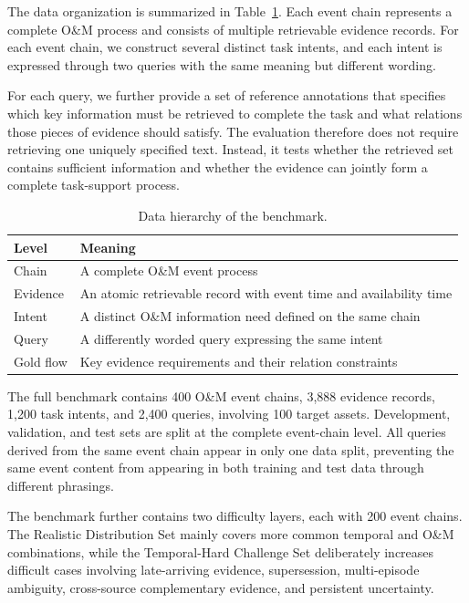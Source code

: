 The data organization is summarized in Table~\ref{tab:dataset_structure}. Each event chain represents a complete O\&M process and consists of multiple retrievable evidence records. For each event chain, we construct several distinct task intents, and each intent is expressed through two queries with the same meaning but different wording.

For each query, we further provide a set of reference annotations that specifies which key information must be retrieved to complete the task and what relations those pieces of evidence should satisfy. The evaluation therefore does not require retrieving one uniquely specified text. Instead, it tests whether the retrieved set contains sufficient information and whether the evidence can jointly form a complete task-support process.

\begin{table}[t]
\caption{Data hierarchy of the benchmark.}
\label{tab:dataset_structure}
\centering
\small
\begin{tabular}{@{}p{}p{}@{}}
\toprule
Level & Meaning \\
\midrule
Chain & A complete O\&M event process \\
Evidence & An atomic retrievable record with event time and availability time \\
Intent & A distinct O\&M information need defined on the same chain \\
Query & A differently worded query expressing the same intent \\
Gold flow & Key evidence requirements and their relation constraints \\
\bottomrule
\end{tabular}
\end{table}

The full benchmark contains 400 O\&M event chains, 3,888 evidence records, 1,200 task intents, and 2,400 queries, involving 100 target assets. Development, validation, and test sets are split at the complete event-chain level. All queries derived from the same event chain appear in only one data split, preventing the same event content from appearing in both training and test data through different phrasings.

The benchmark further contains two difficulty layers, each with 200 event chains. The Realistic Distribution Set mainly covers more common temporal and O\&M combinations, while the Temporal-Hard Challenge Set deliberately increases difficult cases involving late-arriving evidence, supersession, multi-episode ambiguity, cross-source complementary evidence, and persistent uncertainty.

